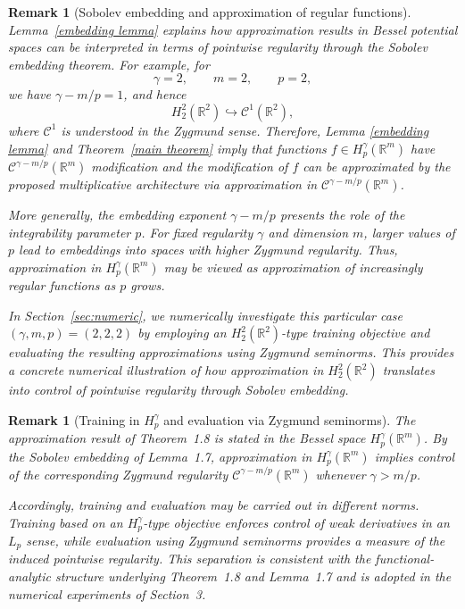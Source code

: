\documentclass[11pt,reqno]{amsart}
\numberwithin{equation}{section}
\newtheorem{remark}[theorem]{\bf{Remark}}
\theoremstyle{remark}
\theoremstyle{definition}
\newcommand\bR{\mathbb{R}}
\newcommand\cC{\mathcal{C}}
\begin{document}
\begin{remark}[Sobolev embedding and approximation of regular functions]
Lemma~\ref{embedding lemma} explains how approximation results in Bessel potential spaces can be interpreted
in terms of pointwise regularity through the Sobolev embedding theorem.
For example, for
\[
\gamma = 2,\qquad m = 2,\qquad p = 2,
\]
we have $\gamma - m/p = 1$, and hence
\[
H^2_2(\mathbb{R}^2) \hookrightarrow \cC^1(\mathbb{R}^2),
\]
where $\cC^1$ is understood in the Zygmund sense. Therefore, Lemma \ref{embedding lemma} and Theorem~\ref{main theorem} imply that functions $f\in H_{p}^{\gamma}(\bR^{m})$ have $\cC^{\gamma - m/p}(\bR^{m})$ modification and the modification of $f$ can be approximated by the proposed multiplicative architecture via approximation in $\cC^{\gamma - m/p}(\bR^{m})$.

More generally, the embedding exponent $\gamma - m/p$ presents the role of the integrability
parameter $p$. For fixed regularity $\gamma$ and dimension $m$, larger values of $p$ lead to embeddings into spaces with higher Zygmund regularity. Thus, approximation in $H^\gamma_p(\bR^m)$ may be viewed as approximation of increasingly regular functions as $p$ grows.

In Section~\ref{sec:numeric}, we numerically investigate this particular case
$(\gamma,m,p)=(2,2,2)$ by employing an $H^2_{2}(\bR^{2})$-type training objective and evaluating the resulting approximations using Zygmund seminorms. This provides a concrete numerical illustration of how approximation in $H_2^2(\bR^{2})$ translates into control of pointwise regularity through Sobolev embedding.
\end{remark}



\begin{remark}[Training in $H_p^\gamma$ and evaluation via Zygmund seminorms]
\label{rem:training-eval-zyg}
The approximation result of Theorem~1.8 is stated in the Bessel space
$H_p^\gamma(\mathbb{R}^m)$.
By the Sobolev embedding of Lemma~1.7, approximation in $H_p^\gamma(\mathbb{R}^m)$ implies control of the corresponding Zygmund regularity $\mathcal{C}^{\gamma-m/p}(\mathbb{R}^m)$ whenever $\gamma>m/p$.

Accordingly, training and evaluation may be carried out in different norms.
Training based on an $H_p^\gamma$-type objective enforces control of weak derivatives in an $L_p$ sense, while evaluation using Zygmund seminorms provides a measure of the induced pointwise regularity. This separation is consistent with the functional-analytic structure underlying Theorem~1.8 and Lemma~1.7 and is adopted in the numerical experiments of Section~3.
\end{remark}
\end{document}
